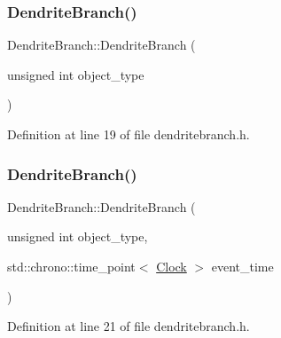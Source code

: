 \subsubsection{\texorpdfstring{Dendrite\+Branch()}{DendriteBranch()}\hspace{0.1cm}{\footnotesize\ttfamily [2/4]}}
{\footnotesize\ttfamily Dendrite\+Branch\+::\+Dendrite\+Branch (\begin{DoxyParamCaption}\item[{unsigned int}]{object\+\_\+type }\end{DoxyParamCaption})\hspace{0.3cm}{\ttfamily [inline]}}



Definition at line 19 of file dendritebranch.\+h.

\mbox{\label{class_dendrite_branch_a390bfee680074f5f3ddcd9aee54db679}} 
\subsubsection{\texorpdfstring{Dendrite\+Branch()}{DendriteBranch()}\hspace{0.1cm}{\footnotesize\ttfamily [3/4]}}
{\footnotesize\ttfamily Dendrite\+Branch\+::\+Dendrite\+Branch (\begin{DoxyParamCaption}\item[{unsigned int}]{object\+\_\+type,  }\item[{std\+::chrono\+::time\+\_\+point$<$ \mbox{\hyperlink{universe_8h_a0ef8d951d1ca5ab3cfaf7ab4c7a6fd80}{Clock}} $>$}]{event\+\_\+time }\end{DoxyParamCaption})\hspace{0.3cm}{\ttfamily [inline]}}



Definition at line 21 of file dendritebranch.\+h.

\mbox{\label{class_dendrite_branch_a9b7e932b0614dad370edd76f31900c40}} 
